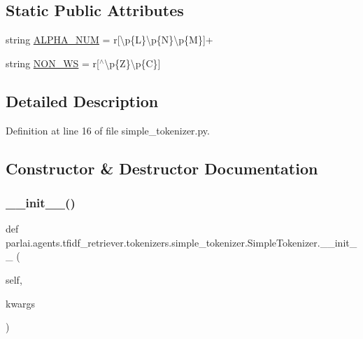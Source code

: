 \subsection*{Static Public Attributes}
\begin{DoxyCompactItemize}
\item 
string \hyperlink{classparlai_1_1agents_1_1tfidf__retriever_1_1tokenizers_1_1simple__tokenizer_1_1SimpleTokenizer_a05623c8143b625ce794a3575065a485f}{A\+L\+P\+H\+A\+\_\+\+N\+UM} = r\textquotesingle{}\mbox{[}\textbackslash{}p\{L\}\textbackslash{}p\{N\}\textbackslash{}p\{M\}\mbox{]}+\textquotesingle{}
\item 
string \hyperlink{classparlai_1_1agents_1_1tfidf__retriever_1_1tokenizers_1_1simple__tokenizer_1_1SimpleTokenizer_a317087dd1dd245f051472def2190d889}{N\+O\+N\+\_\+\+WS} = r\textquotesingle{}\mbox{[}$^\wedge$\textbackslash{}p\{Z\}\textbackslash{}p\{C\}\mbox{]}\textquotesingle{}
\end{DoxyCompactItemize}


\subsection{Detailed Description}


Definition at line 16 of file simple\+\_\+tokenizer.\+py.



\subsection{Constructor \& Destructor Documentation}
\mbox{\label{classparlai_1_1agents_1_1tfidf__retriever_1_1tokenizers_1_1simple__tokenizer_1_1SimpleTokenizer_a6a038fd66269e0a8e76e62260b13f4d9}} 
\subsubsection{\texorpdfstring{\+\_\+\+\_\+init\+\_\+\+\_\+()}{\_\_init\_\_()}}
{\footnotesize\ttfamily def parlai.\+agents.\+tfidf\+\_\+retriever.\+tokenizers.\+simple\+\_\+tokenizer.\+Simple\+Tokenizer.\+\_\+\+\_\+init\+\_\+\+\_\+ (\begin{DoxyParamCaption}\item[{}]{self,  }\item[{}]{kwargs }\end{DoxyParamCaption})}


